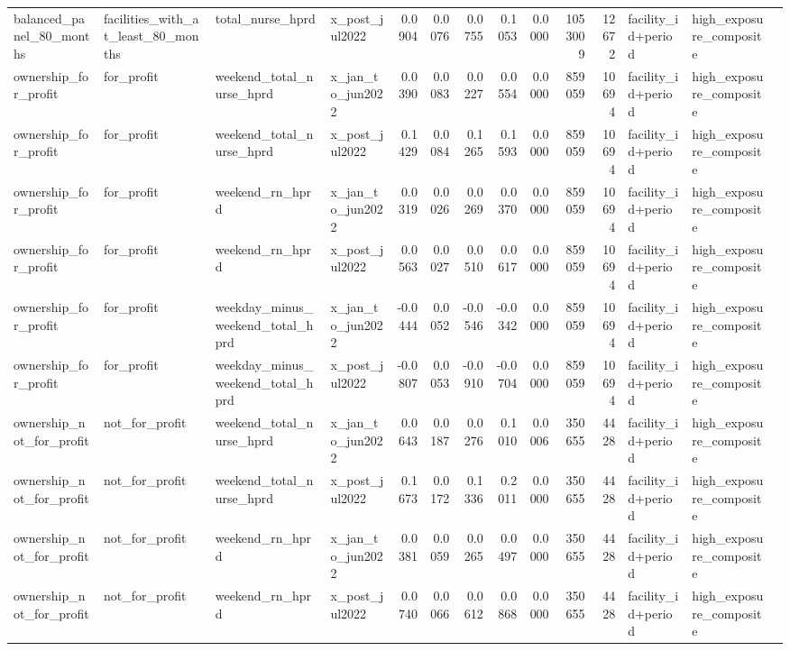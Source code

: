 \begin{tabular}{llllrrrrrrrlll}
balanced_panel_80_months & facilities_with_at_least_80_months & total_nurse_hprd & x_post_jul2022 & 0.0904 & 0.0076 & 0.0755 & 0.1053 & 0.0000 & 1053009 & 12672 & facility_id+period & high_exposure_composite &  \\
ownership_for_profit & for_profit & weekend_total_nurse_hprd & x_jan_to_jun2022 & 0.0390 & 0.0083 & 0.0227 & 0.0554 & 0.0000 & 859059 & 10694 & facility_id+period & high_exposure_composite &  \\
ownership_for_profit & for_profit & weekend_total_nurse_hprd & x_post_jul2022 & 0.1429 & 0.0084 & 0.1265 & 0.1593 & 0.0000 & 859059 & 10694 & facility_id+period & high_exposure_composite &  \\
ownership_for_profit & for_profit & weekend_rn_hprd & x_jan_to_jun2022 & 0.0319 & 0.0026 & 0.0269 & 0.0370 & 0.0000 & 859059 & 10694 & facility_id+period & high_exposure_composite &  \\
ownership_for_profit & for_profit & weekend_rn_hprd & x_post_jul2022 & 0.0563 & 0.0027 & 0.0510 & 0.0617 & 0.0000 & 859059 & 10694 & facility_id+period & high_exposure_composite &  \\
ownership_for_profit & for_profit & weekday_minus_weekend_total_hprd & x_jan_to_jun2022 & -0.0444 & 0.0052 & -0.0546 & -0.0342 & 0.0000 & 859059 & 10694 & facility_id+period & high_exposure_composite &  \\
ownership_for_profit & for_profit & weekday_minus_weekend_total_hprd & x_post_jul2022 & -0.0807 & 0.0053 & -0.0910 & -0.0704 & 0.0000 & 859059 & 10694 & facility_id+period & high_exposure_composite &  \\
ownership_not_for_profit & not_for_profit & weekend_total_nurse_hprd & x_jan_to_jun2022 & 0.0643 & 0.0187 & 0.0276 & 0.1010 & 0.0006 & 350655 & 4428 & facility_id+period & high_exposure_composite &  \\
ownership_not_for_profit & not_for_profit & weekend_total_nurse_hprd & x_post_jul2022 & 0.1673 & 0.0172 & 0.1336 & 0.2011 & 0.0000 & 350655 & 4428 & facility_id+period & high_exposure_composite &  \\
ownership_not_for_profit & not_for_profit & weekend_rn_hprd & x_jan_to_jun2022 & 0.0381 & 0.0059 & 0.0265 & 0.0497 & 0.0000 & 350655 & 4428 & facility_id+period & high_exposure_composite &  \\
ownership_not_for_profit & not_for_profit & weekend_rn_hprd & x_post_jul2022 & 0.0740 & 0.0066 & 0.0612 & 0.0868 & 0.0000 & 350655 & 4428 & facility_id+period & high_exposure_composite &  \\

\end{tabular}

